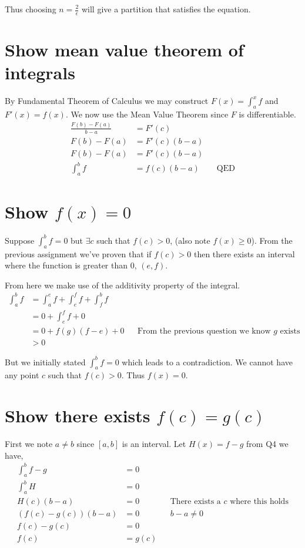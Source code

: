 \documentclass{article}
\begin{document}
Thus choosing $n = \frac{2}{\epsilon}$ will give a partition that satisfies
the equation.

\section{Show mean value theorem of integrals}
By Fundamental Theorem of Calculus we may construct $F(x) = \int_a^x f$ and
$F'(x) = f(x)$. We now use the Mean Value Theorem since $F$ is differentiable.
\begin{align*}
    \frac{F(b) - F(a)}{b - a} &= F'(c) \\
    F(b) - F(a) &= F'(c)(b - a) \\
    F(b) - F(a) &= F'(c)(b - a) \\
    \int_a^b f &= f(c)(b - a) && \text{QED}
\end{align*}

\section{Show $f(x) = 0$}
Suppose $\int_a^b f = 0$ but $\exists c$ such that $f(c) > 0$,
(also note $f(x) \geq 0$). From the
previous assignment we've proven that if $f(c) > 0$ then there exists an
interval where the function is greater than 0, $(e, f)$.

From here we make use of the additivity property of the integral.
\begin{align*}
    \int_a^b f &= \int_a^e f + \int_e^f f + \int_f^b f \\
    &= 0 + \int_e^f f + 0 \\
    &= 0 + f(g)(f-e) + 0
    && \text{From the previous question we know $g$ exists} \\
    &> 0
\end{align*}

But we initially stated $\int_a^b f = 0$ which leads to a contradiction. We
cannot have any point $c$ such that $f(c) > 0$. Thus $f(x) = 0$.

\section{Show there exists $f(c) = g(c)$}
First we note $a \neq b$ since $[a,b]$ is an interval.
Let $H(x) = f - g$ from Q4 we have,
\begin{align*}
    \int_a^b f - g &= 0 \\
    \int_a^b H &= 0 \\
    H(c)(b - a) &= 0 && \text{There exists a $c$ where this holds} \\
    (f(c) - g(c))(b - a) &= 0 && \text{$b - a \neq 0$} \\
    f(c) - g(c) &= 0 \\
    f(c) &= g(c) \\
\end{align*}
\end{document}
